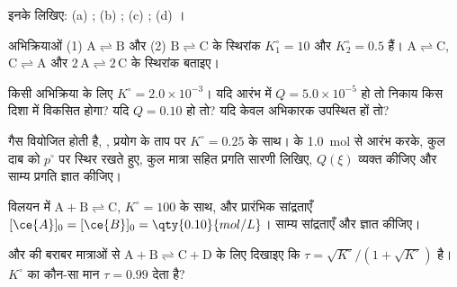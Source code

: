\begin{exercise}[$\star$]\label{exo:b1:extent-q-and-k:4}
इनके  लिखिए: (a) ;
(b) ; (c) ; (d) ।
\end{exercise}

\begin{exercise}[$\star\star$]\label{exo:b1:extent-q-and-k:5}
अभिक्रियाओं (1) $\mathrm{A \rightleftharpoons B}$ और (2) $\mathrm{B \rightleftharpoons C}$ के स्थिरांक
$K_1^\circ = 10$ और $K_2^\circ = 0.5$ हैं। $\mathrm{A \rightleftharpoons C}$,
$\mathrm{C \rightleftharpoons A}$ और $\mathrm{2\,A \rightleftharpoons 2\,C}$ के स्थिरांक बताइए।
\end{exercise}

\begin{exercise}[$\star\star$]\label{exo:b1:extent-q-and-k:6}
किसी अभिक्रिया के लिए $K^\circ = 2.0 \times 10^{-3}$। यदि आरंभ में
$Q = 5.0 \times 10^{-5}$ हो तो निकाय किस दिशा में विकसित होगा? यदि $Q = 0.10$ हो तो?
यदि केवल अभिकारक उपस्थित हों तो?
\end{exercise}

\begin{exercise}[$\star\star$]\label{exo:b1:extent-q-and-k:7}
गैस  वियोजित होती है, , प्रयोग के ताप पर
$K^\circ = 0.25$ के साथ।  के \qty{1.0}{mol} से आरंभ करके,
कुल दाब को $p^\circ$ पर स्थिर रखते हुए, कुल मात्रा सहित प्रगति सारणी
लिखिए, $Q(\xi)$ व्यक्त कीजिए और साम्य प्रगति ज्ञात कीजिए।
\end{exercise}

\begin{exercise}[$\star\star$]\label{exo:b1:extent-q-and-k:8}
विलयन में $\mathrm{A + B \rightleftharpoons C}$, $K^\circ = 100$ के साथ, और प्रारंभिक
सांद्रताएँ $[\ce{A}]_0 = [\ce{B}]_0 = \qty{0.10}{mol/L}$। साम्य
सांद्रताएँ और  ज्ञात कीजिए।
\end{exercise}

\begin{exercise}[$\star\star$]\label{exo:b1:extent-q-and-k:9}
 और  की बराबर मात्राओं से $\mathrm{A + B \rightleftharpoons C + D}$ के लिए दिखाइए कि
 $\tau = \sqrt{K^\circ}/(1 + \sqrt{K^\circ})$ है।
$K^\circ$ का कौन-सा मान $\tau = 0.99$ देता है?
\end{exercise}

